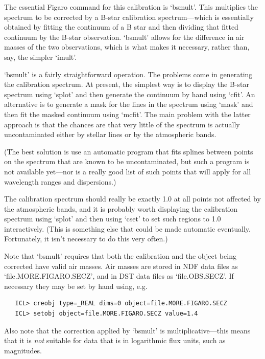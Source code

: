 \documentclass[11pt,twoside]{article}
\newcommand{\latorhtm}[2]{#1}
\newcommand{\latorhtm}[2]{#2}
\begin{document}
   The essential Figaro command for this calibration is `bsmult'.  This
   multiplies the spectrum to be corrected by a B-star calibration
   spectrum\latorhtm{---}{-}which is essentially obtained by fitting the
   continuum of
   a B star and then dividing that fitted continuum by the B-star
   observation.  `bsmult' allows for the difference in air masses of the
   two observations, which is what makes it necessary, rather than, say,
   the simpler `imult'.

   `bsmult' is a fairly straightforward operation.  The problems come in
   generating the calibration spectrum.  At present, the simplest way is
   to display the B-star spectrum using `splot' and then generate the
   continuum by hand using `cfit'.  An alternative is to generate a mask
   for the lines in the spectrum using `mask' and then fit the masked
   continuum using `mcfit'.  The main problem with the latter approach
   is that the chances are that very little of the spectrum is actually
   uncontaminated either by stellar lines or by the atmospheric bands.

   (The best solution is use an automatic program that fits splines
   between points on the spectrum that are known to be uncontaminated,
   but such a program is not available yet\latorhtm{---}{-}nor is a really
   good list of such points that will apply for all wavelength ranges and
   dispersions.)

   The calibration spectrum should really be exactly 1.0 at all points
   not affected by the atmospheric bands, and it is probably worth
   displaying the calibration spectrum using `splot' and then using
   `cset' to set such regions to 1.0 interactively.  (This is something
   else that could be made automatic eventually.  Fortunately, it isn't
   necessary to do this very often.)

   Note that `bsmult' requires that both the calibration and the object
   being corrected have valid air masses.  Air masses are stored in NDF
   data files as `file.MORE.FIGARO.SECZ', and in DST data files as
   `file.OBS.SECZ'. If necessary they may be set by hand using, e.g.

\begin{verbatim}
   ICL> creobj type=_REAL dims=0 object=file.MORE.FIGARO.SECZ
   ICL> setobj object=file.MORE.FIGARO.SECZ value=1.4
\end{verbatim}

   Also note that the correction applied by `bsmult' is
   multiplicative\latorhtm{---}{-}this means that it is {\em not\/}
   suitable for data that is in logarithmic flux units, such as
   magnitudes.
\end{document}

